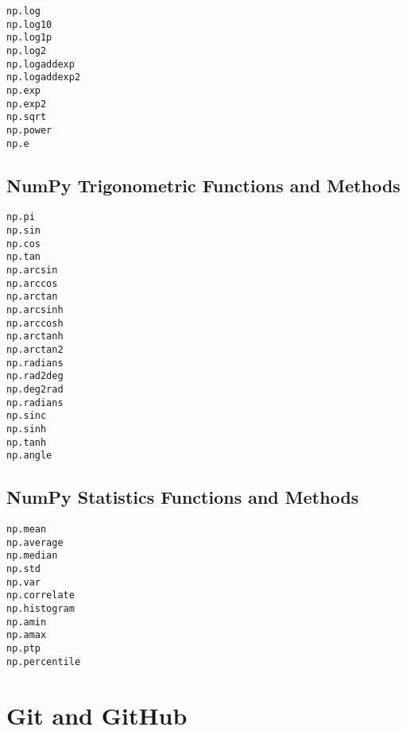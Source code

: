 \documentclass{book}
\newenvironment{key_terms}{\begin{multicols}{3}}{\end{multicols}} %
\begin{document}
    
        \begin{key_terms}
        \begin{lstlisting}
np.log
np.log10
np.log1p
np.log2
np.logaddexp
np.logaddexp2
np.exp
np.exp2
np.sqrt
np.power
np.e
\end{lstlisting}
        \end{key_terms}

    




    
        \hypertarget{numpy-trigonometric-functions-and-methods}{%
\subsection{NumPy Trigonometric Functions and
Methods}\label{numpy-trigonometric-functions-and-methods}}
    




    
        \begin{key_terms}
        \begin{lstlisting}
np.pi
np.sin
np.cos
np.tan
np.arcsin
np.arccos
np.arctan
np.arcsinh
np.arccosh
np.arctanh
np.arctan2
np.radians
np.rad2deg
np.deg2rad
np.radians
np.sinc
np.sinh
np.tanh
np.angle
\end{lstlisting}
        \end{key_terms}

    




    
        \hypertarget{numpy-statistics-functions-and-methods}{%
\subsection{NumPy Statistics Functions and
Methods}\label{numpy-statistics-functions-and-methods}}
    




    
        \begin{key_terms}
        \begin{lstlisting}
np.mean
np.average
np.median
np.std
np.var
np.correlate
np.histogram
np.amin
np.amax
np.ptp
np.percentile
\end{lstlisting}
        \end{key_terms}

    




    
        \hypertarget{git-and-github}{%
\section{Git and GitHub}\label{git-and-github}}
    
\end{document}
